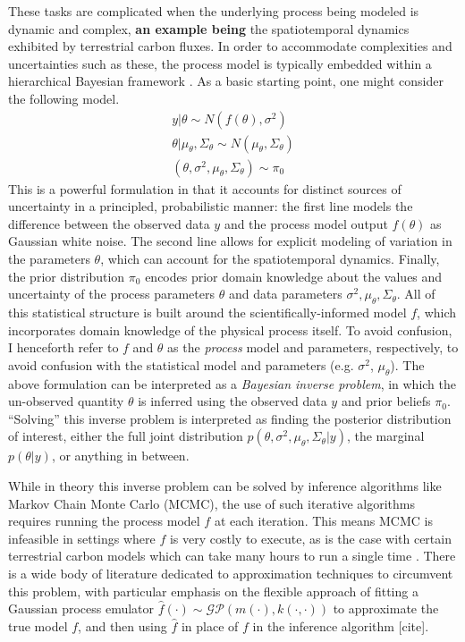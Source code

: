 \documentclass[12pt]{article}
\begin{document}
These 
tasks are complicated when the underlying process being modeled is dynamic and complex, \textbf{an example being} the spatiotemporal dynamics exhibited by terrestrial carbon fluxes.
In order to accommodate complexities and uncertainties such as these, the process model is typically embedded within a hierarchical Bayesian framework \cite{Clark}. As a basic starting 
point, one might consider the following model. 
\begin{align*}
y|\theta \sim N(f(\theta), \sigma^2) \\
\theta|\mu_{\theta}, \Sigma_{\theta} \sim N(\mu_{\theta}, \Sigma_{\theta}) \\
(\theta, \sigma^2, \mu_{\theta}, \Sigma_{\theta}) \sim \pi_0
\end{align*}
This is a powerful formulation in that it accounts for distinct sources of uncertainty in a principled, probabilistic manner: the first line models the difference between the 
observed data $y$ and the process model output $f(\theta)$ as Gaussian white noise. The second line allows for explicit modeling of variation in the 
parameters $\theta$, which can account for the spatiotemporal dynamics. Finally, the prior distribution $\pi_0$ encodes prior domain knowledge about the values and uncertainty of the process parameters $\theta$ and data parameters 
$\sigma^2, \mu_\theta, \Sigma_{\theta}$. All of this statistical structure is built around the scientifically-informed model $f$, which incorporates domain knowledge of the physical 
process itself. To avoid confusion, I henceforth refer to $f$ and $\theta$ as the 
\textit{process} model and parameters, respectively, to avoid confusion with the statistical model and parameters (e.g. $\sigma^2$, $\mu_\theta$).  
The above formulation can be interpreted as a \textit{Bayesian inverse problem}, in which the un-observed quantity $\theta$ is inferred using the observed data $y$ and prior 
beliefs $\pi_0$. ``Solving'' this inverse problem is interpreted as finding the posterior distribution of interest, either the full joint distribution $p(\theta, \sigma^2, \mu_\theta, \Sigma_\theta|y)$, 
the marginal $p(\theta|y)$, or anything in between. 

While in theory this inverse problem can be solved by inference algorithms like Markov Chain Monte Carlo (MCMC), the use of such iterative algorithms requires running the 
process model $f$ at each iteration. This means MCMC is infeasible in settings where $f$ is very costly to execute, as is the case with certain terrestrial carbon models which can take
many hours to run a single time \cite{Fer}. There is a wide body of literature dedicated to approximation techniques to circumvent this problem, with particular emphasis on the 
flexible approach of fitting a Gaussian process emulator $\hat{f}(\cdot) \sim \mathcal{GP}(m(\cdot), k(\cdot, \cdot))$ to approximate the true model $f$, and then using $\hat{f}$
in place of $f$ in the inference algorithm [cite].
\end{document}
